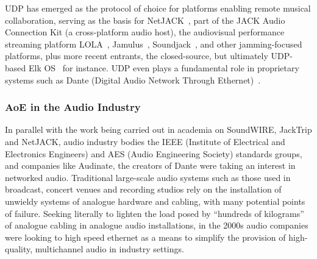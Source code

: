 UDP has emerged as the protocol of choice for platforms enabling remote musical
collaboration, serving as the basis for NetJACK~\citep{carot_netjack_2009}, part
of the JACK Audio Connection Kit (a cross-platform audio host), the audiovisual
performance streaming platform LOLA~\citep{drioli_networked_2013},
Jamulus~\citep{fischer_case_2015}, Soundjack~\citep{renaud_networked_2012}, and
other jamming-focused platforms, plus more recent entrants, the closed-source,
but ultimately UDP-based Elk OS~\citep{turchet_elk_2021} for instance.
UDP even plays a fundamental role in proprietary systems such as Dante (Digital
Audio Network Through Ethernet)~\citep{dante_what_2022}.

\subsubsection{AoE in the Audio Industry}

In parallel with the work being carried out in academia on SoundWIRE, JackTrip
and NetJACK, audio industry bodies \textemdash{} the IEEE (Institute of
Electrical and Electronics Engineers) and AES (Audio Engineering Society)
standards groups, and companies like Audinate, the creators of Dante
\textemdash{} were taking an interest in networked audio.
Traditional large-scale audio systems such as those used in broadcast, concert
venues and recording studios rely on the installation of unwieldy systems of
analogue hardware and cabling, with many potential points of failure.
Seeking literally to lighten the load posed by ``hundreds of
kilograms''~\citep{bakker_introduction_2014} of analogue cabling in analogue
audio installations, in the 2000s audio companies were looking to high speed
ethernet as a means to simplify the provision of high-quality, multichannel
audio in industry settings.

